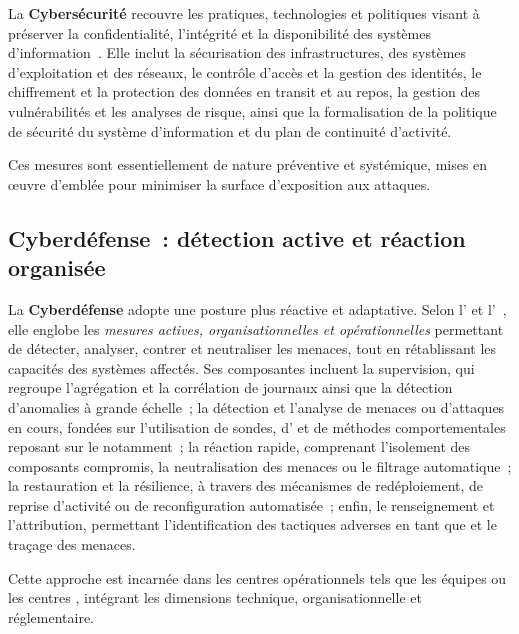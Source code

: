 La \textbf{Cybersécurité} recouvre les pratiques, technologies et politiques visant à préserver la confidentialité, l'intégrité et la disponibilité des systèmes d'information~\cite{ANSSI2024}. Elle inclut la sécurisation des infrastructures, des systèmes d'exploitation et des réseaux, le contrôle d'accès et la gestion des identités, le chiffrement et la protection des données en transit et au repos, la gestion des vulnérabilités et les analyses de risque, ainsi que la formalisation de la politique de sécurité du système d'information et du plan de continuité d'activité.

Ces mesures sont essentiellement de nature préventive et systémique, mises en œuvre d'emblée pour minimiser la surface d'exposition aux attaques.

\subsection*{Cyberdéfense~: détection active et réaction organisée}

La \textbf{Cyberdéfense} adopte une posture plus réactive et adaptative. Selon l' et l'~\cite{ANSSI2024,NATO2016Cyberdef}, elle englobe les \emph{mesures actives, organisationnelles et opérationnelles} permettant de détecter, analyser, contrer et neutraliser les menaces, tout en rétablissant les capacités des systèmes affectés. Ses composantes incluent la supervision, qui regroupe l'agrégation et la corrélation de journaux ainsi que la détection d'anomalies à grande échelle~; la détection et l'analyse de menaces ou d'attaques en cours, fondées sur l'utilisation de sondes, d' et de méthodes comportementales reposant sur le  notamment~; la réaction rapide, comprenant l'isolement des composants compromis, la neutralisation des menaces ou le filtrage automatique~; la restauration et la résilience, à travers des mécanismes de redéploiement, de reprise d'activité ou de reconfiguration automatisée~; enfin, le renseignement et l'attribution, permettant l'identification des tactiques adverses en tant que  et le traçage des menaces.

Cette approche est incarnée dans les centres opérationnels tels que les équipes  ou les centres , intégrant les dimensions technique, organisationnelle et réglementaire.


